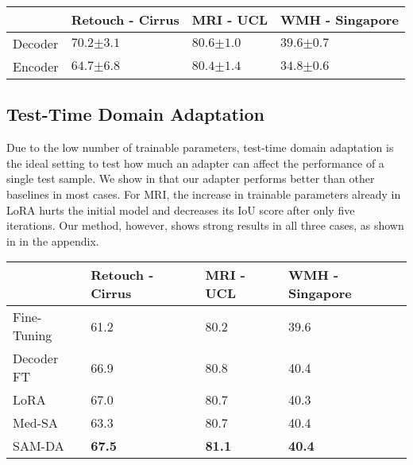 \begin{table}[]
\centering
\begin{tabular}{@{}lP{3cm}P{2.5cm}P{3cm}@{}}
\toprule
 & Retouch - Cirrus & MRI - UCL & WMH - Singapore  \\ \midrule
Decoder & $\mathbf{70.2}{\scriptscriptstyle \pm 3.1}$ & $\mathbf{80.6}{\scriptscriptstyle \pm 1.0}$ & $\mathbf{39.6}{\scriptscriptstyle \pm 0.7}$ \\
Encoder & $64.7{\scriptscriptstyle \pm 6.8}$ & $80.4{\scriptscriptstyle \pm 1.4}$ & $34.8{\scriptscriptstyle \pm 0.6}$ \\ \bottomrule

\end{tabular}
\end{table}

\subsection{Test-Time Domain Adaptation}
Due to the low number of trainable parameters, test-time domain adaptation is the ideal setting to test how much an adapter can affect the performance of a single test sample. We show in  that our adapter performs better than other baselines in most cases. For MRI, the increase in trainable parameters already in LoRA hurts the initial model and decreases its IoU score after only five iterations. Our method, however, shows strong results in all three cases, as shown in  in the appendix.


\begin{table}[]
\centering
\begin{tabular}{@{}lP{2.5cm}P{2.5cm}P{3cm}@{}}
\toprule
 & Retouch - Cirrus & MRI - UCL & WMH - Singapore \\ \midrule
Fine-Tuning & 61.2 & 80.2 & 39.6 \\
Decoder FT & 66.9 & 80.8 & 40.4 \\
LoRA~\cite{hu2022lora} & 67.0 & 80.7 & 40.3 \\
Med-SA~\cite{wu2023medical} & 63.3 & 80.7 & 40.4 \\ \midrule
SAM-DA & \textbf{67.5} & \textbf{81.1} & \textbf{40.4} \\ \bottomrule
\end{tabular}
\end{table}


